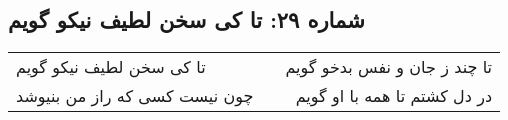 \begin{center}
\section*{شماره ۲۹: تا کی سخن لطیف نیکو گویم}
\label{sec:029}
\begin{longtable}{l p{0.5cm} r}
تا کی سخن لطیف نیکو گویم
&&
تا چند ز جان و نفس بدخو گویم
\\
چون نیست کسی که راز من بنیوشد
&&
در دل کشتم تا همه با او گویم
\\
\end{longtable}
\end{center}
